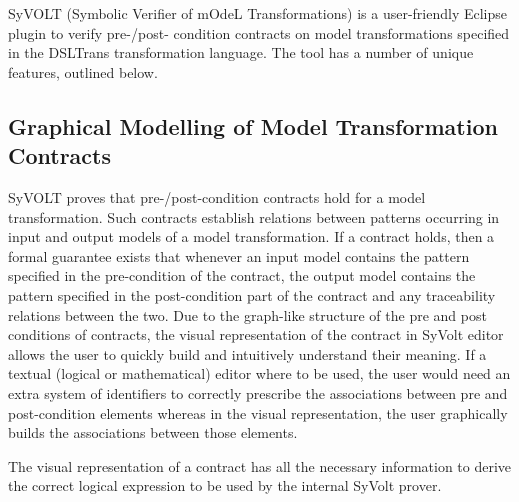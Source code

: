 SyVOLT (Symbolic Verifier of mOdeL Transformations) is a user-friendly Eclipse plugin to verify pre-/post- condition contracts
on model transformations specified in the DSLTrans transformation language. The
tool has a number of unique features, outlined below.

\subsection{Graphical Modelling of Model Transformation Contracts}

 SyVOLT
proves that pre-/post-condition contracts hold for a model transformation. Such
contracts establish relations between patterns occurring in input and output
models of a model transformation. If a contract holds, then a formal guarantee
exists that whenever an input model contains the pattern specified in the
pre-condition of the contract, the output model contains the pattern specified
in the post-condition part of the contract and any traceability relations
between the two.
Due to the graph-like structure of the pre and post conditions of contracts, the
visual representation of the contract in SyVolt editor allows the user to
quickly build and intuitively understand their meaning.
If a textual (logical or mathematical) editor where to be used, the user would
need an extra system of identifiers to correctly prescribe the associations
between pre and post-condition elements whereas in the visual representation,
the user graphically builds the associations between those elements.

The visual representation of a contract has all the necessary information to
derive the correct logical expression to be used by the internal SyVolt prover.

